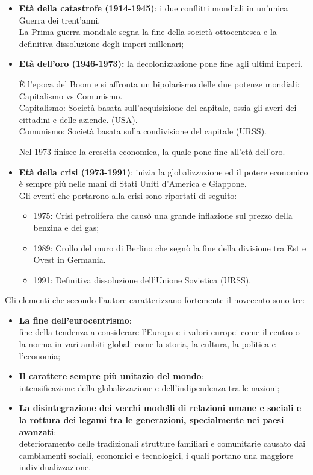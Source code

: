 \documentclass{article}
\begin{document}
\begin{itemize}
    \item \textbf{Età della catastrofe (1914-1945)}: i due conflitti mondiali in un'unica Guerra dei trent'anni.\\
        La Prima guerra mondiale segna la fine della società ottocentesca e la definitiva
        dissoluzione degli imperi millenari;
    \item \textbf{Età dell'oro (1946-1973):} la decolonizzazione pone fine agli ultimi imperi.

        È l'epoca del Boom e si affronta un bipolarismo delle due potenze mondiali: Capitalismo vs Comunismo.\\
        {\footnotesize Capitalismo: Società basata sull'acquisizione del capitale, ossia gli
        averi dei cittadini e delle aziende. (USA).}\\
        {\footnotesize Comunismo: Società basata sulla condivisione del capitale (URSS).}

        Nel 1973 finisce la crescita economica, la quale pone fine all'età dell'oro.
    \item \textbf{Età della crisi (1973-1991)}: inizia la globalizzazione ed il potere economico
        è sempre più nelle mani di Stati Uniti d'America e Giappone.\\
        Gli eventi che portarono alla crisi sono riportati di seguito:
        \begin{itemize}
            \item 1975: Crisi petrolifera che causò una grande inflazione sul prezzo della benzina e dei gas;
            \item 1989: Crollo del muro di Berlino che segnò la fine della divisione tra
                Est e Ovest in Germania.
            \item 1991: Definitiva dissoluzione dell'Unione Sovietica (URSS).
        \end{itemize}
\end{itemize}

Gli elementi che secondo l'autore caratterizzano fortemente il novecento sono tre:
\begin{itemize}
    \item \textbf{La fine dell'eurocentrismo}:\\
        fine della tendenza a considerare l'Europa e i valori europei come il centro o la norma
        in vari ambiti globali come la storia, la cultura, la politica e l'economia;
    \item \textbf{Il carattere sempre più unitazio del mondo}:\\
        intensificazione della globalizzazione e dell'indipendenza tra le nazioni;
    \item \textbf{La disintegrazione dei vecchi modelli di relazioni umane e sociali e la rottura
        dei legami tra le generazioni, specialmente nei paesi avanzati}:\\
        deterioramento delle tradizionali strutture familiari e comunitarie causato dai 
        cambiamenti sociali, economici e tecnologici, i quali portano una maggiore individualizzazione.
\end{itemize}
\end{document}
